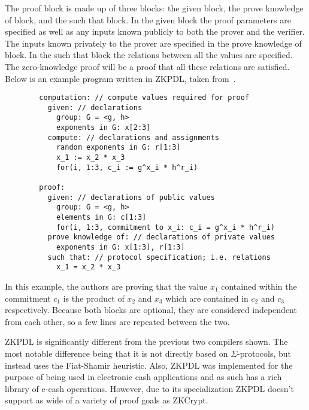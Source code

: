 \documentclass{sig-alternate}
\begin{document}
		The proof block is made up of three blocks: the given block, the 
		prove knowledge of block, and the such that block. In the
		given block the proof parameters are specified as well as any inputs
		known publicly to both the prover and the verifier. The inputs known privately to
		the prover are specified in the prove knowledge of block. In the 
		such that block the relations between all the values are specified.
		The zero-knowledge proof will be a proof that all these relations are satisfied.
		Below is an example program written in ZKPDL, taken from~\cite{ZKPDL:2010}.
		
		\begin{verbatim}
		computation: // compute values required for proof
		  given: // declarations
		    group: G = <g, h>
		    exponents in G: x[2:3]
		  compute: // declarations and assignments
		    random exponents in G: r[1:3]
		    x_1 := x_2 * x_3
		    for(i, 1:3, c_i := g^x_i * h^r_i)
		    
		proof:
		  given: // declarations of public values
		    group: G = <g, h>
		    elements in G: c[1:3]
		    for(i, 1:3, commitment to x_i: c_i = g^x_i * h^r_i)
		  prove knowledge of: // declarations of private values
		    exponents in G: x[1:3], r[1:3]
		  such that: // protocol specification; i.e. relations
		    x_1 = x_2 * x_3
		\end{verbatim}
		
		In this example, the authors are proving that the value $x_{1}$ contained within
		the commitment $c_{1}$ is the product of $x_{2}$ and $x_{3}$ which are contained
		in $c_{2}$ and $c_{3}$ respectively. Because both blocks are optional, they are
		considered independent from each other, so a few lines are repeated between the two.
		
		ZKPDL is significantly different from the previous two compilers shown. The most notable
		difference being that it is not directly based on $\Sigma$-protocols, but instead uses
		the Fiat-Shamir heuristic. Also, ZKPDL was implemented for the purpose of being
		used in electronic cash applications and as such has a rich library of e-cash operations.
		However, due to its specialization ZKPDL doesn't support as wide of a variety of proof goals
		as ZKCrypt.
		
\end{document}
